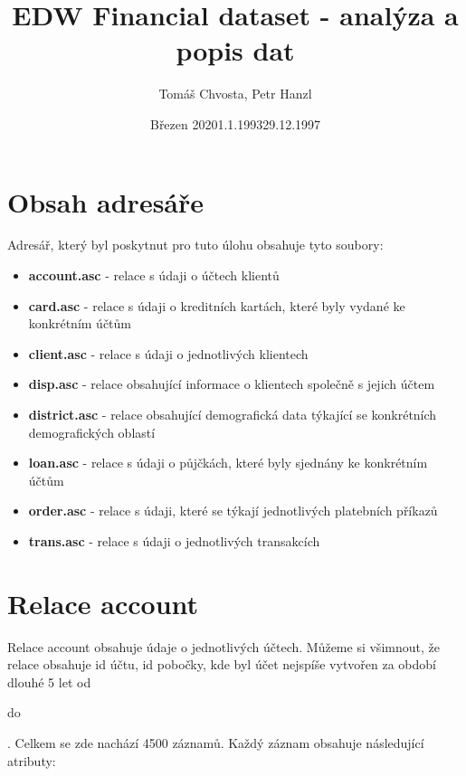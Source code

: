 \documentclass{article}
\title{EDW Financial dataset - analýza a popis dat}
\author{Tomáš Chvosta, Petr Hanzl }
\date{Březen 2020}
\begin{document}
\maketitle

\section{Obsah adresáře}

Adresář, který byl poskytnut pro tuto úlohu obsahuje tyto soubory:

\begin{itemize}
				
	\item \textbf{account.asc} - relace s údaji o účtech klientů
    \item \textbf{card.asc} - relace s údaji o kreditních kartách, které byly vydané ke konkrétním účtům
    \item \textbf{client.asc} - relace s údaji o jednotlivých klientech
    \item \textbf{disp.asc} - relace obsahující informace o klientech společně s jejich účtem
    \item \textbf{district.asc} - relace obsahující demografická data týkající se konkrétních demografických oblastí
    \item \textbf{loan.asc} - relace s údaji o půjčkách, které byly sjednány ke konkrétním účtům
    \item \textbf{order.asc} - relace s údaji, které se týkají jednotlivých platebních příkazů
    \item \textbf{trans.asc} - relace s údaji o jednotlivých transakcích
					
				
\end{itemize}

\section{Relace account}

Relace account obsahuje údaje o jednotlivých účtech. Můžeme si všimnout, že relace obsahuje id účtu, id pobočky, kde byl účet nejspíše vytvořen za období dlouhé 5 let od \date{1.1.1993} do \date{29.12.1997}. Celkem se zde nachází 4500 záznamů. Každý záznam obsahuje následující atributy:
\end{document}
